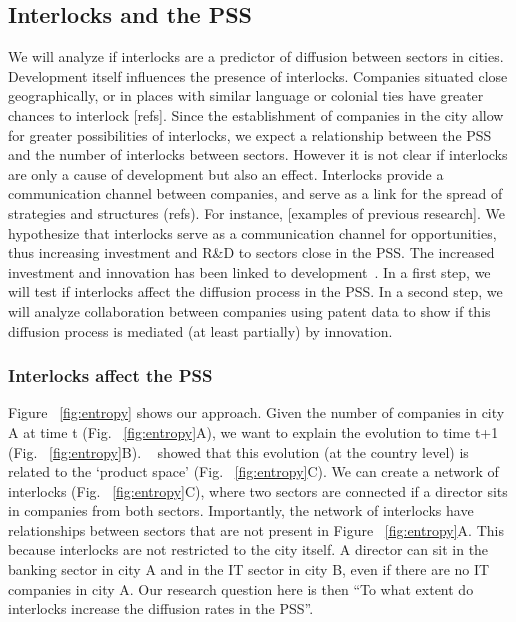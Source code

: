 \subsection{Interlocks and the PSS}
We will analyze if interlocks are a predictor of diffusion between sectors in cities. 
Development itself influences the presence of interlocks.
Companies situated close geographically, or in places with similar language or colonial ties 
have greater chances to interlock [refs].
Since the establishment of companies in the city allow for greater possibilities of interlocks,
we expect a relationship between the PSS and the number of interlocks between sectors.
However it is not clear if interlocks are only a cause of development but also an effect.
Interlocks provide a communication channel between companies, 
and serve as a link for the spread of strategies and structures (refs).
For instance, [examples of previous research].
We hypothesize that interlocks serve as a communication channel for opportunities,
thus increasing investment and R\&D to sectors close in the PSS.
The increased investment and innovation has been linked to development~\citep{Romer1991,grossman1991,hidalgo2007}.
In a first step, we will test if interlocks affect the diffusion process in the PSS.
In a second step, we will analyze collaboration between companies using patent data to show if this diffusion process is mediated (at least partially) by innovation.

\subsubsection{Interlocks affect the PSS}
Figure ~\ref{fig:entropy} shows our approach. 
Given the number of companies in city A at time t (Fig. ~\ref{fig:entropy}A), 
we want to explain the evolution to time t+1 (Fig. ~\ref{fig:entropy}B).
~\cite{hidalgo2009} showed that this evolution (at the country level) is related to the `product space' (Fig. ~\ref{fig:entropy}C).
We can create a network of interlocks (Fig. ~\ref{fig:entropy}C),
where two sectors are connected if a director sits in companies from both sectors.
Importantly, the network of interlocks have relationships between sectors that are not present in Figure ~\ref{fig:entropy}A. 
This because interlocks are not restricted to the city itself.
A director can sit in the banking sector in city A and in the IT sector in city B, even if there are no IT companies in city A.
Our research question here is then ``To what extent do interlocks increase the diffusion rates in the PSS''.


